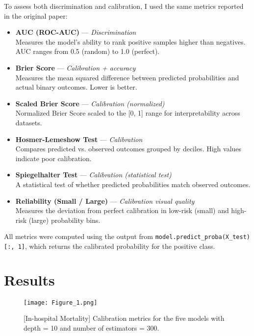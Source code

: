 \documentclass{article}
\begin{document}
To assess both discrimination and calibration, I used the same metrics reported in the original paper:

\begin{itemize}
  \item \textbf{AUC (ROC-AUC)} — \emph{Discrimination} \\
  Measures the model’s ability to rank positive samples higher than negatives. AUC ranges from 0.5 (random) to 1.0 (perfect).
  
  \item \textbf{Brier Score} — \emph{Calibration + accuracy} \\
  Measures the mean squared difference between predicted probabilities and actual binary outcomes. Lower is better.
  
  \item \textbf{Scaled Brier Score} — \emph{Calibration (normalized)} \\
  Normalized Brier Score scaled to the [0, 1] range for interpretability across datasets.
  
  \item \textbf{Hosmer-Lemeshow Test} — \emph{Calibration} \\
  Compares predicted vs. observed outcomes grouped by deciles. High values indicate poor calibration.
  
  \item \textbf{Spiegelhalter Test} — \emph{Calibration (statistical test)} \\
  A statistical test of whether predicted probabilities match observed outcomes.
  
  \item \textbf{Reliability (Small / Large)} — \emph{Calibration visual quality} \\
  Measures the deviation from perfect calibration in low-risk (small) and high-risk (large) probability bins.
\end{itemize}

All metrics were computed using the output from \texttt{model.predict\_proba(X\_test)[:, 1]}, which returns the calibrated probability for the positive class.

\section*{Results}

\begin{figure}[h]
\centering
\texttt{[image: Figure\_1.png]}

\caption{[In-hospital Mortality] Calibration metrics for the five models with depth = 10 and number of estimators = 300.}

\end{figure}
\end{document}
